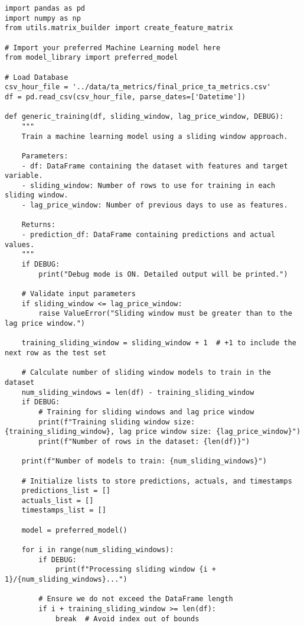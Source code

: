 \documentclass[12pt]{report} %
\begin{document}
\begin{lstlisting}
import pandas as pd
import numpy as np
from utils.matrix_builder import create_feature_matrix

# Import your preferred Machine Learning model here
from model_library import preferred_model

# Load Database
csv_hour_file = '../data/ta_metrics/final_price_ta_metrics.csv'
df = pd.read_csv(csv_hour_file, parse_dates=['Datetime'])

def generic_training(df, sliding_window, lag_price_window, DEBUG):
    """
    Train a machine learning model using a sliding window approach.
    
    Parameters:
    - df: DataFrame containing the dataset with features and target variable.
    - sliding_window: Number of rows to use for training in each sliding window.
    - lag_price_window: Number of previous days to use as features.
    
    Returns:
    - prediction_df: DataFrame containing predictions and actual values.
    """
    if DEBUG:
        print("Debug mode is ON. Detailed output will be printed.")

    # Validate input parameters
    if sliding_window <= lag_price_window:
        raise ValueError("Sliding window must be greater than to the lag price window.")

    training_sliding_window = sliding_window + 1  # +1 to include the next row as the test set

    # Calculate number of sliding window models to train in the dataset
    num_sliding_windows = len(df) - training_sliding_window
    if DEBUG:
        # Training for sliding windows and lag price window
        print(f"Training sliding window size: {training_sliding_window}, lag price window size: {lag_price_window}")
        print(f"Number of rows in the dataset: {len(df)}")

    print(f"Number of models to train: {num_sliding_windows}")

    # Initialize lists to store predictions, actuals, and timestamps
    predictions_list = []
    actuals_list = []
    timestamps_list = []

    model = preferred_model()

    for i in range(num_sliding_windows):
        if DEBUG:
            print(f"Processing sliding window {i + 1}/{num_sliding_windows}...")

        # Ensure we do not exceed the DataFrame length
        if i + training_sliding_window >= len(df):
            break  # Avoid index out of bounds
        

\end{lstlisting}
\end{document}
